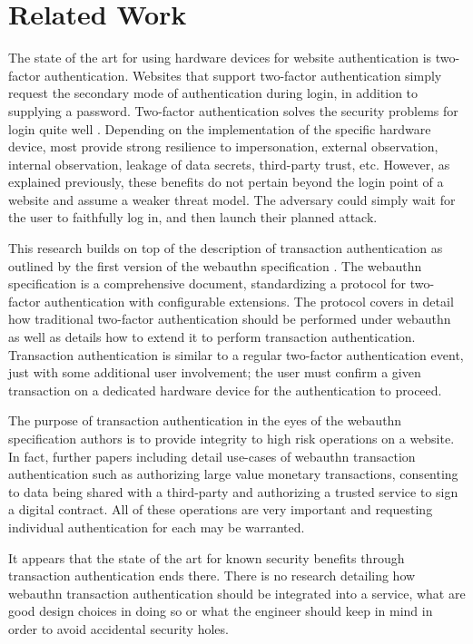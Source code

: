 \chapter{Related Work}


The state of the art for using hardware devices for website authentication is two-factor authentication. Websites that support two-factor authentication simply request the secondary mode of authentication during login, in addition to supplying a password. Two-factor authentication solves the security problems for login quite well \cite{TODO-quest-to-remove-passwords}. Depending on the implementation of the specific hardware device, most provide strong resilience to impersonation, external observation, internal observation, leakage of data secrets, third-party trust, etc. However, as explained previously, these benefits do not pertain beyond the login point of a website and assume a weaker threat model. The adversary could simply wait for the user to faithfully log in, and then launch their planned attack. 

This research builds on top of the description of transaction authentication as outlined by the first version of the webauthn specification \cite{webauthn}. The webauthn specification is a comprehensive document, standardizing a protocol for two-factor authentication with configurable extensions. The protocol covers in detail how traditional two-factor authentication should be performed under webauthn as well as details how to extend it to perform transaction authentication. Transaction authentication is similar to a regular two-factor authentication event, just with some additional user involvement; the user must confirm a given transaction on a dedicated hardware device for the authentication to proceed. 

The purpose of transaction authentication in the eyes of the webauthn specification authors is to provide integrity to high risk operations on a website. In fact, further papers including \cite{EuroFIDO} detail use-cases of webauthn transaction authentication such as authorizing large value monetary transactions, consenting to data being shared with a third-party and authorizing a trusted service to sign a digital contract. All of these operations are very important and requesting individual authentication for each may be warranted. 

It appears that the state of the art for known security benefits through transaction authentication ends there. There is no research detailing how webauthn transaction authentication should be integrated into a service, what are good design choices in doing so or what the engineer should keep in mind in order to avoid accidental security holes.

\iffalse

\fi
